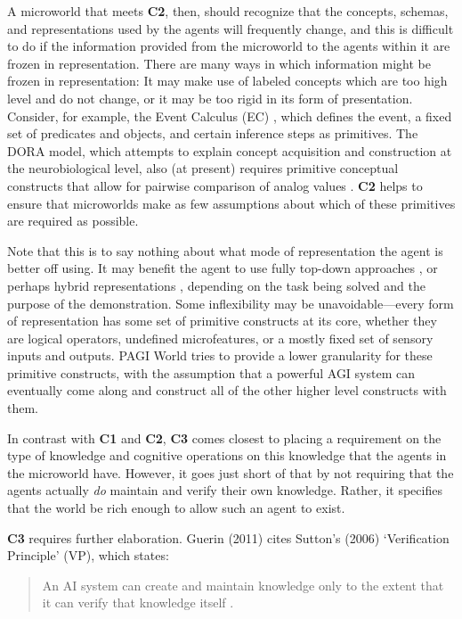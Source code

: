 A microworld that meets \textbf{C2}, then, should recognize that the concepts, schemas, and representations used by the agents will frequently change, and this is difficult to do if the information provided from the microworld to the agents within it are frozen in representation. There are many ways in which information might be frozen in representation: It may make use of labeled concepts which are too high level and do not change, or it may be too rigid in its form of presentation. Consider, for example, the Event Calculus (EC) \cite{EVENTCALCULUS}, which defines the event, a fixed set of predicates and objects, and certain inference steps as primitives. The DORA model, which attempts to explain concept acquisition and construction at the neurobiological level, also (at present) requires primitive conceptual constructs that allow for pairwise comparison of analog values \cite{Doumas2008,Doumas2013}. \textbf{C2} helps to ensure that microworlds make as few assumptions about which of these primitives are required as possible.

Note that this is to say nothing about what mode of representation the agent is better off using. It may benefit the agent to use fully top-down approaches \cite{Bringsjord2008a,Bringsjord2008c}, or perhaps hybrid representations \cite{Sun2002}, depending on the task being solved and the purpose of the demonstration. Some inflexibility may be unavoidable---every form of representation has some set of primitive constructs at its core, whether they are logical operators, undefined microfeatures, or a mostly fixed set of sensory inputs and outputs. PAGI World tries to provide a lower granularity for these primitive constructs, with the assumption that a powerful AGI system can eventually come along and construct all of the other higher level constructs with them.

In contrast with \textbf{C1} and \textbf{C2}, \textbf{C3} comes closest to placing a requirement on the type of knowledge and cognitive operations on this knowledge that the agents in the microworld have. However, it goes just short of that by not requiring that the agents actually \textit{do} maintain and verify their own knowledge. Rather, it specifies that the world be rich enough to allow such an agent to exist.

\textbf{C3} requires further elaboration. Guerin (2011) cites Sutton's (2006) `Verification Principle' (VP), which states:

\begin{quote}
An AI system can create and maintain knowledge only to the extent that it can verify that knowledge itself \cite{Sutton2006}.
\end{quote}


